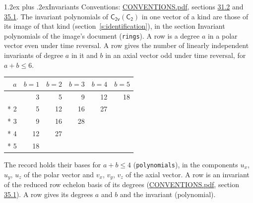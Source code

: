 \documentclass[10pt,a4paper]{article}
\makeatletter
\renewcommand\section{\@startsection{section}{1}{\z@}{-3ex plus -1ex minus -.2ex}%
  {1.2ex plus .2ex}{\normalfont\large\sffamily\bfseries\color{parttitle}}}
\numberwithin{equation}{section}
\newcommand{\grp}[1]{\mathsf{#1}}
\makeatother
\begin{document}
\section{Invariants}\label{s:invariants}
Conventions: \href{../../CONVENTIONS.pdf}{CONVENTIONS.pdf}, sections \href{../../CONVENTIONS.pdf\#conv.31.2}{31.2} and \href{../../CONVENTIONS.pdf\#conv.35.1}{35.1}.
The invariant polynomials of $\grp{C_{2v}}(\grp{C_{2}})$ in one vector of a kind are those of its image of that kind (section~\ref{s:identification}), in the section Invariant polynomials of the image's document (\texttt{rings}).
\leavevmode\label{n:index.degree.polar}\label{n:index.degree.axial}A row is a degree $a$ in a polar vector even under time reversal. A row gives the number of linearly independent invariants of degree $a$ in it and $b$ in an axial vector odd under time reversal, for $a + b \le 6$.
{\small\begin{longtable}{@{}rrrrrr@{}}\toprule
$a$ & $b = 1$ & $b = 2$ & $b = 3$ & $b = 4$ & $b = 5$\\\midrule\endhead
\bottomrule\endfoot\endlastfoot
1 & 3 & 5 & 9 & 12 & 18\\*
2 & 5 & 12 & 16 & 27 & \\*
3 & 9 & 16 & 28 &  & \\*
4 & 12 & 27 &  &  & \\*
5 & 18 &  &  &  & \\
\bottomrule\end{longtable}}
\leavevmode\label{n:local.component.polar}\label{n:local.component.axial}The record holds their bases for $a + b \le 4$ (\texttt{polynomials}), in the components $u_{x}$, $u_{y}$, $u_{z}$ of the polar vector and $v_{x}$, $v_{y}$, $v_{z}$ of the axial vector. \label{n:head.polynomial}A row is an invariant of the reduced row echelon basis of its degrees (\href{../../CONVENTIONS.pdf}{CONVENTIONS.pdf}, section \href{../../CONVENTIONS.pdf\#conv.35.1}{35.1}). A row gives its degrees $a$ and $b$ and the invariant (polynomial).
\end{document}
